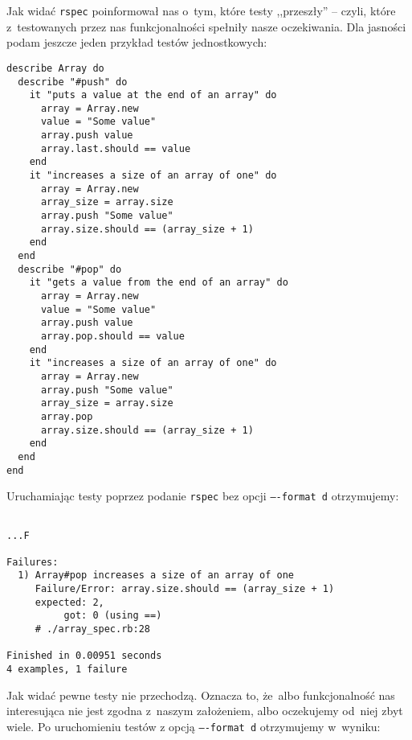 Jak widać \texttt{rspec} poinformował nas o~tym, które testy ,,przeszły'' -- czyli, które z~testowanych przez nas funkcjonalności spełniły nasze oczekiwania. Dla jasności podam jeszcze jeden przykład testów jednostkowych:

   \label{code.testzly}
  \begin{lstlisting}
describe Array do
  describe "#push" do
    it "puts a value at the end of an array" do
      array = Array.new
      value = "Some value"
      array.push value
      array.last.should == value
    end
    it "increases a size of an array of one" do
      array = Array.new
      array_size = array.size
      array.push "Some value"
      array.size.should == (array_size + 1)
    end
  end
  describe "#pop" do
    it "gets a value from the end of an array" do
      array = Array.new
      value = "Some value"
      array.push value
      array.pop.should == value
    end
    it "increases a size of an array of one" do
      array = Array.new
      array.push "Some value"
      array_size = array.size
      array.pop
      array.size.should == (array_size + 1)
    end
  end
end
  \end{lstlisting}

Uruchamiając testy poprzez podanie \texttt{rspec} bez opcji \texttt{----format d} otrzymujemy:

  \begin{lstlisting}

...F

Failures:
  1) Array#pop increases a size of an array of one
     Failure/Error: array.size.should == (array_size + 1)
     expected: 2,
          got: 0 (using ==)
     # ./array_spec.rb:28

Finished in 0.00951 seconds
4 examples, 1 failure
  \end{lstlisting}

Jak widać pewne testy nie przechodzą. Oznacza to, że~albo funkcjonalność nas interesująca nie jest zgodna z~naszym założeniem, albo oczekujemy od~niej zbyt wiele. Po uruchomieniu testów z opcją \texttt{----format d} otrzymujemy w~wyniku:

